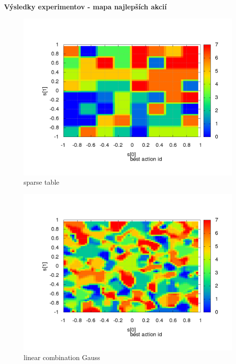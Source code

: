 \documentclass[xcolor=dvipsnames]{beamer}
\begin{document}
\begin{frame}{\bf Výsledky experimentov - mapa najlepších akcií}

\begin{minipage}{.5\textwidth}

\begin{figure}[!htb]
\centering
\includegraphics[scale=.2]{../../results_q_learning/map_1/function_type_1/iterations_10/action_best_value_log_surface.png}
\caption{sparse table}
\end{figure}

\end{minipage}%
\begin{minipage}{.5\textwidth}

\begin{figure}[!htb]
\centering
\includegraphics[scale=.2]{../../results_q_learning/map_1/function_type_2/iterations_10/action_best_value_log_surface.png}
\caption{linear combination Gauss}
\end{figure}


\end{minipage}
\end{frame}
\end{document}
